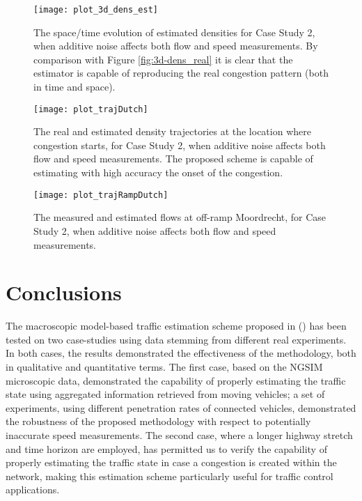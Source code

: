 \documentclass[titlepage,oneside,fleqn,12pt]{article}
\newcommand{\trbnum}[1]{{\it \citenum{#1}}}
\begin{document}
\begin{figure}
\begin{center}
	\texttt{[image: plot\_3d\_dens\_est]}
	\caption{The space/time evolution of estimated densities for Case Study 2, when additive noise affects both flow and speed measurements. By comparison with Figure \ref{fig:3d-dens_real} it is clear that the estimator is capable of reproducing the real congestion pattern (both in time and space).}
	\label{fig:3d-dens_est}
\end{center}
\end{figure}

\begin{figure}
\begin{center}
	\texttt{[image: plot\_trajDutch]}
	\caption{The real and estimated density trajectories at the location where congestion starts, for Case Study 2, when additive noise affects both flow and speed measurements. The proposed scheme is capable of estimating with high accuracy the onset of the congestion.} 
	\label{fig:trajDutch}
\end{center}
\end{figure}

\begin{figure}
\begin{center}
	\texttt{[image: plot\_trajRampDutch]}
	\caption{The measured and estimated flows at off-ramp Moordrecht, for Case Study 2,  when additive noise affects both flow and speed measurements.} 
	\label{fig:trajRampDutch}
\end{center}
\end{figure}


\section{Conclusions} \label{sec:concl}

The macroscopic model-based traffic estimation scheme proposed in (\trbnum{Bekiaris2015}) has been tested on two case-studies using data stemming from different real experiments. In both cases, the results demonstrated the effectiveness of the methodology, both in qualitative and quantitative terms. The first case, based on the NGSIM microscopic data, demonstrated the capability of properly estimating the traffic state using aggregated information retrieved from moving vehicles; a set of experiments, using different penetration rates of connected vehicles, demonstrated the robustness of the proposed methodology with respect to potentially inaccurate speed measurements. The second case, where a longer highway stretch and time horizon are employed, has permitted us to verify the capability of properly estimating the traffic state in case a congestion is created within the network, making this estimation scheme particularly useful for traffic control applications. 
\end{document}
